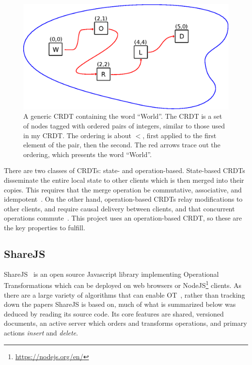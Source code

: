 \documentclass[12pt,a4paper,twoside,openright]{report}
\begin{document}
	\begin{figure}[H]
	\centering
	\includegraphics[width=1\linewidth]{figs/tagged_set.eps}
	\caption[Text CRDT as a tagged set]{A generic CRDT containing the word ``World''. The CRDT is a set of nodes tagged with ordered pairs of integers, similar to those used in my CRDT. The ordering is about $<$, first applied to the first element of the pair, then the second. The red arrows trace out the ordering, which presents the word ``World''.}
	\label{fig:taggedset}
	\end{figure}
	
	There are two classes of CRDTs: state- and operation-based. State-based CRDTs disseminate the entire local state to other clients which is then merged into their copies. This requires that the merge operation be commutative, associative, and idempotent~\cite{shapiro2011}. On the other hand, operation-based CRDTs relay modifications to other clients, and require causal delivery between clients, and that concurrent operations commute~\cite{takada2013}. This project uses an operation-based CRDT, so these are the key properties to fulfill.

	\subsection{ShareJS} \label{sec:sharejs}
	
	ShareJS~\cite{sharejs} is an open source Javascript library implementing Operational Transformations which can be deployed on web browsers or NodeJS\footnote{\url{https://nodejs.org/en/}} clients. As there are a large variety of algorithms that can enable OT~\cite{kumawat2016}, rather than tracking down the papers ShareJS is based on, much of what is summarized below was deduced by reading its source code. Its core features are shared, versioned documents, an active server which orders and transforms operations, and primary actions \textit{insert} and \textit{delete}.
	
\end{document}
